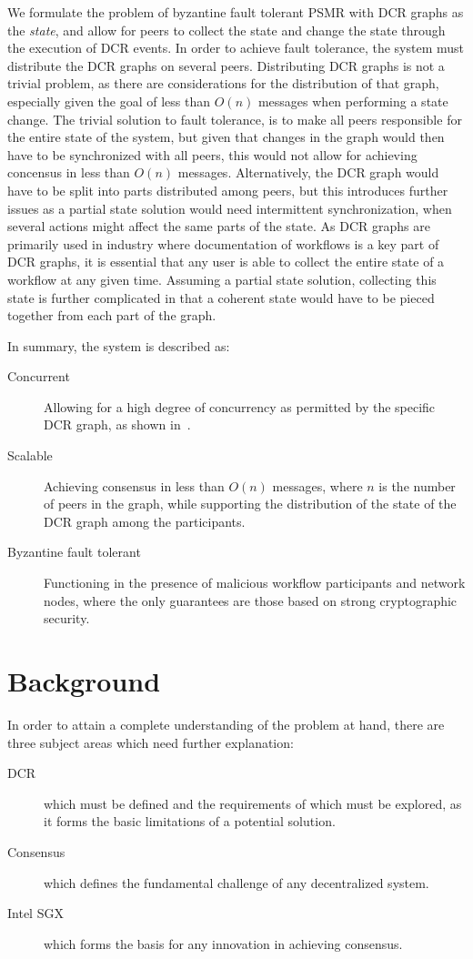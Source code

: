 \documentclass{article}
\begin{document}
	We formulate the problem of byzantine fault tolerant PSMR with DCR graphs as the \textit{state}, and allow for peers to collect the state and change the state through the execution of DCR events.
	In order to achieve fault tolerance, the system must distribute the DCR graphs on several peers.
	Distributing DCR graphs is not a trivial problem, as there are considerations for the distribution of that graph, especially given the goal of less than $O(n)$ messages when performing a state change.
	The trivial solution to fault tolerance, is to make all peers responsible for the entire state of the system, but given that changes in the graph would then have to be synchronized with all peers, this would not allow for achieving concensus in less than $O(n)$ messages.
	Alternatively, the DCR graph would have to be split into parts distributed among peers, but this introduces further issues as a partial state solution would need intermittent synchronization, when several actions might affect the same parts of the state.
	As DCR graphs are primarily used in industry where documentation of workflows is a key part of DCR graphs, it is essential that any user is able to collect the entire state of a workflow at any given time.
	Assuming a partial state solution, collecting this state is further complicated in that a coherent state would have to be pieced together from each part of the graph.

	In summary, the system is described as:
	\begin{description}
		\item[Concurrent] Allowing for a high degree of concurrency as permitted by the specific DCR graph, as shown in~\cite{debois_concurrency_2015}.
        \item[Scalable] Achieving consensus in less than $O(n)$ messages, where $n$ is the number of peers in the graph, while supporting the distribution of the state of the DCR graph among the participants.
		\item[Byzantine fault tolerant] Functioning in the presence of malicious workflow participants and network nodes, where the only guarantees are those based on strong cryptographic security.
	\end{description}

\section{Background}

In order to attain a complete understanding of the problem at hand, there are three subject areas which need further explanation:
\begin{description}
	\item[DCR] which must be defined and the requirements of which must be explored, as it forms the basic limitations of a potential solution.
	\item[Consensus] which defines the fundamental challenge of any decentralized system.
	\item[Intel SGX] which forms the basis for any innovation in achieving consensus.
\end{description}
\end{document}
